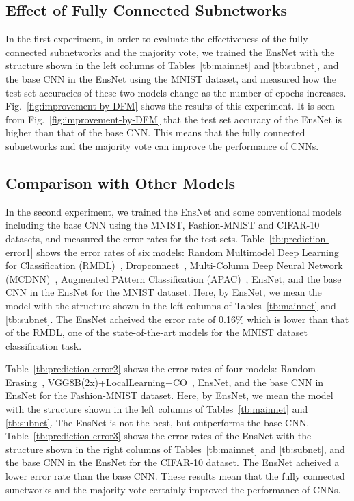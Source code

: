 \documentclass[a4j]{article}
\begin{document}
\subsection{Effect of Fully Connected Subnetworks}
In the first experiment, in order to evaluate the effectiveness of the fully connected subnetworks and the majority vote, we trained the EnsNet with the structure shown in the left columns of Tables~\ref{tb:mainnet} and \ref{tb:subnet}, and the base CNN in the EnsNet using the MNIST dataset, and measured how the test set accuracies of these two models change as the number of epochs increases. Fig.~\ref{fig:improvement-by-DFM} shows the results of this experiment. It is seen from Fig.~\ref{fig:improvement-by-DFM} that the test set accuracy of the EnsNet is higher than that of the base CNN. This means that the fully connected subnetworks and the majority vote can improve the performance of CNNs. 

\subsection{Comparison with Other Models}
In the second experiment, we trained the EnsNet and some conventional models including the base CNN using the MNIST, Fashion-MNIST and CIFAR-10 datasets, and measured the error rates for the test sets. Table~\ref{tb:prediction-error1} shows the error rates of six models: Random Multimodel Deep Learning for Classification (RMDL)~\cite{RMDL}, Dropconnect~\cite{Dropconnect}, Multi-Column Deep Neural Network (MCDNN)~\cite{MCDNN}, Augmented PAttern Classification (APAC)~\cite{APAC}, EnsNet, and the base CNN in the EnsNet for the MNIST dataset. Here, by EnsNet, we mean the model with the structure shown in the left columns of Tables~\ref{tb:mainnet} and \ref{tb:subnet}. The EnsNet acheived the error rate of 0.16\% which is lower than that of the RMDL, one of the state-of-the-art models for the MNIST dataset classification task. 



Table~\ref{tb:prediction-error2} shows the error rates of four models: Random Erasing~\cite{RandomErasing}, VGG8B(2x)+LocalLearning+CO~\cite{VGG8LCO}, EnsNet, and the base CNN in EnsNet for the Fashion-MNIST dataset. Here, by EnsNet, we mean the model with the structure shown in the left columns of Tables~\ref{tb:mainnet} and \ref{tb:subnet}. The EnsNet is not the best, but outperforms the base CNN. Table~\ref{tb:prediction-error3} shows the error rates of the EnsNet with the structure shown in the right columns of Tables~\ref{tb:mainnet} and \ref{tb:subnet}, and the base CNN in the EnsNet for the CIFAR-10 dataset. The EnsNet acheived a lower error rate than the base CNN. These results mean that the fully connected sunetworks and the majority vote certainly improved the performance of CNNs. 
\end{document}

